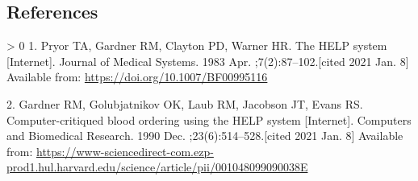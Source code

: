 \documentclass[
]{article}
\newlength{\cslhangindent}
\newenvironment{CSLReferences}[3] %
 {%
  \setlength{\parindent}{0pt}
  \ifodd #1 \everypar{\setlength{\hangindent}{\cslhangindent}}\ignorespaces\fi
  \ifnum #2 > 0
  \setlength{\parskip}{#2\baselineskip}
  \fi
 }%
 {}
\begin{document}
\hypertarget{references}{%
\subsection*{References}\label{references}}

\hypertarget{refs}{}
\begin{CSLReferences}{0}{0}
\leavevmode\hypertarget{ref-pryor_help_1983}{}%
1. Pryor TA, Gardner RM, Clayton PD, Warner HR. The {HELP} system {[}Internet{]}. Journal of Medical Systems. 1983 Apr. ;7(2):87--102.{[}cited 2021 Jan. 8{]} Available from: \url{https://doi.org/10.1007/BF00995116}

\leavevmode\hypertarget{ref-gardner_computer-critiqued_1990}{}%
2. Gardner RM, Golubjatnikov OK, Laub RM, Jacobson JT, Evans RS. Computer-critiqued blood ordering using the {HELP} system {[}Internet{]}. Computers and Biomedical Research. 1990 Dec. ;23(6):514--528.{[}cited 2021 Jan. 8{]} Available from: \url{https://www-sciencedirect-com.ezp-prod1.hul.harvard.edu/science/article/pii/001048099090038E}

\end{CSLReferences}
\end{document}
